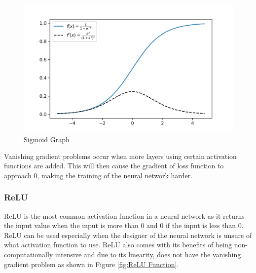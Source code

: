 \documentclass{tum-book}
\begin{document}
            \begin{figure}[h]
                \centering
                \includegraphics[scale=0.75]{myFiles/myImages/Sigmoid.png}
                \caption{Sigmoid Graph}
                \label{fig:Sigmoid Function}
            \end{figure}
            
        \noindent
        Vanishing gradient problems occur when more layers using certain activation functions are added. This will then cause the gradient of loss function to approach 0, making the training of the neural network harder.

            \newpage\subsubsection{ReLU}
            ReLU is the most common activation function in a neural network as it returns the input value when the input is more than 0 and 0 if the input is less than 0. ReLU can be used especially when the designer of the neural network is unsure of what activation function to use. ReLU also comes with its benefits of being non-computationally intensive and due to its linearity, does not have the vanishing gradient problem as shown in Figure \ref{fig:ReLU Function}.
            
\end{document}
